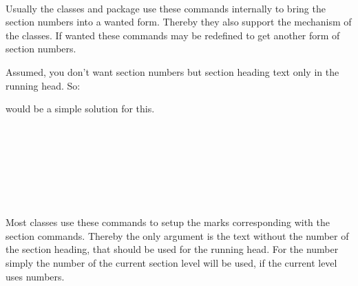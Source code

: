 \begin{Declaration}
  \\
  \\
  \\
  \\
  \\
  \\
\end{Declaration}
%
%
%
%
%
%
%
Usually the \KOMAScript{} classes and package  use these
commands internally to bring the section numbers into a wanted form. Thereby
they also support the  mechanism of the \KOMAScript{}
classes. If wanted these commands may be redefined to get another form of
section numbers.%
%
\begin{Example}
  Assumed, you don't want section numbers but section heading text only in the
  running head. So:
\begin{lstcode}
  \renewcommand*{\sectionmarkformat}{}
\end{lstcode}
  would be a simple solution for this.
\end{Example}
%
%
%
%
%
%
%
%

\begin{Declaration}
  \\
  \\
  \\
  \\
  \\
  \\
\end{Declaration}
%
%
%
%
%
%
%
Most classes use these commands to setup the marks corresponding with the
section commands. Thereby the only argument is the text without the number of
the section heading, that should be used for the running head. For the number
simply the number of the current section level will be used, if the current
level uses numbers.

